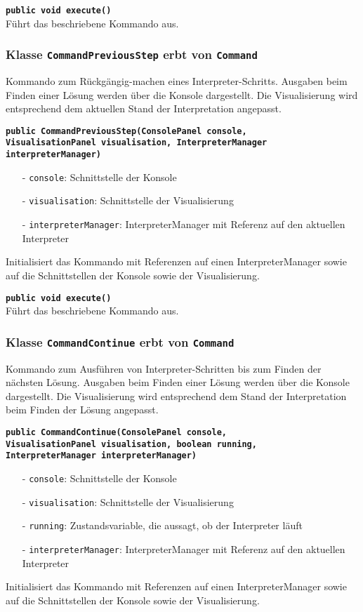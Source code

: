 \documentclass[parskip=full,11pt,twoside]{scrartcl}
\begin{document}
\textbf{\texttt{public void execute()}}\\
Führt das beschriebene Kommando aus.

\subsubsection{Klasse \texttt{CommandPreviousStep} erbt von \texttt{Command}}

Kommando zum Rückgängig-machen eines Interpreter-Schritts. Ausgaben beim Finden einer Lösung werden über die Konsole dargestellt. Die Visualisierung wird entsprechend dem aktuellen Stand der Interpretation angepasst.

\textbf{\texttt{public CommandPreviousStep(ConsolePanel console,\\VisualisationPanel visualisation, InterpreterManager\\interpreterManager)}}
\begin{itemize}[noitemsep]
	\item[-] \texttt{console}: Schnittstelle der Konsole
	\item[-] \texttt{visualisation}: Schnittstelle der Visualisierung
	\item[-] \texttt{interpreterManager}: InterpreterManager mit Referenz auf den aktuellen Interpreter
\end{itemize}
Initialisiert das Kommando mit Referenzen auf einen InterpreterManager sowie auf die Schnittstellen der Konsole sowie der Visualisierung.

\textbf{\texttt{public void execute()}}\\
Führt das beschriebene Kommando aus.

\subsubsection{Klasse \texttt{CommandContinue} erbt von \texttt{Command}}

Kommando zum Ausführen von Interpreter-Schritten bis zum Finden der nächsten Lösung. Ausgaben beim Finden einer Lösung werden über die Konsole dargestellt. Die Visualisierung wird entsprechend dem Stand der Interpretation beim Finden der Lösung angepasst.

\textbf{\texttt{public CommandContinue(ConsolePanel console,\\VisualisationPanel visualisation, boolean running,\\InterpreterManager interpreterManager)}}
\begin{itemize}[noitemsep]
	\item[-] \texttt{console}: Schnittstelle der Konsole
	\item[-] \texttt{visualisation}: Schnittstelle der Visualisierung
    \item[-] \texttt{running}: Zustandsvariable, die aussagt, ob der Interpreter läuft
	\item[-] \texttt{interpreterManager}: InterpreterManager mit Referenz auf den aktuellen Interpreter
\end{itemize}
Initialisiert das Kommando mit Referenzen auf einen InterpreterManager sowie auf die Schnittstellen der Konsole sowie der Visualisierung.
\end{document}
